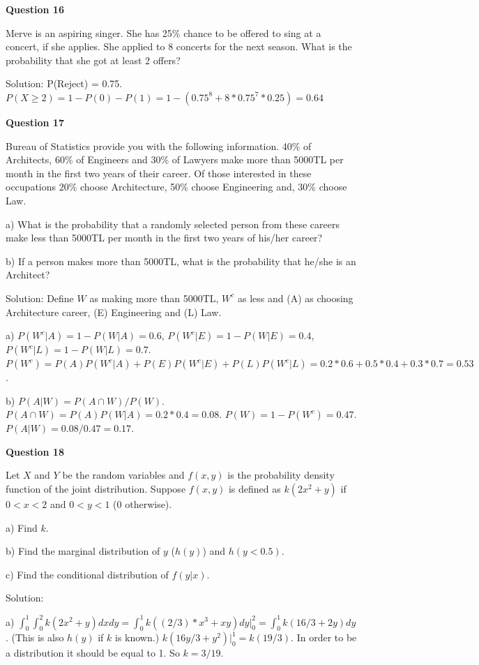 \documentclass[]{book}
\theoremstyle{definition}
\theoremstyle{definition}
\theoremstyle{definition}
\theoremstyle{remark}
\begin{document}
\textbf{Question 16}

Merve is an aspiring singer. She has 25\% chance to be offered to sing
at a concert, if she applies. She applied to 8 concerts for the next
season. What is the probability that she got at least 2 offers?

Solution: P(Reject) = 0.75.
\(P(X \ge 2) = 1 - P(0) - P(1) = 1 - (0.75^8 + 8*0.75^7*0.25) = 0.64\)

\textbf{Question 17}

Bureau of Statistics provide you with the following information. 40\% of
Architects, 60\% of Engineers and 30\% of Lawyers make more than 5000TL
per month in the first two years of their career. Of those interested in
these occupations 20\% choose Architecture, 50\% choose Engineering and,
30\% choose Law.

a) What is the probability that a randomly selected person from these
careers make less than 5000TL per month in the first two years of
his/her career?

b) If a person makes more than 5000TL, what is the probability that
he/she is an Architect?

Solution: Define \(W\) as making more than 5000TL, \(W^c\) as less and
(A) as choosing Architecture career, (E) Engineering and (L) Law.

a) \(P(W^c|A) = 1 - P(W|A) = 0.6\), \(P(W^c|E) = 1 - P(W|E) = 0.4\),
\(P(W^c|L) = 1 - P(W|L) = 0.7\).
\(P(W^c) = P(A)P(W^c|A)+P(E)P(W^c|E)+P(L)P(W^c|L) = 0.2*0.6+0.5*0.4+0.3*0.7 = 0.53\).

b) \(P(A|W) = P(A \cap W)/P(W)\).
\(P(A \cap W) = P(A)P(W|A) = 0.2*0.4 = 0.08\).
\(P(W) = 1 - P(W^c) = 0.47\). \(P(A|W) = 0.08/0.47 = 0.17\).

\textbf{Question 18}

Let \(X\) and \(Y\) be the random variables and \(f(x,y)\) is the
probability density function of the joint distribution. Suppose
\(f(x,y)\) is defined as \(k(2x^2 + y)\) if \(0<x<2\) and \(0<y<1\) (0
otherwise).

a) Find \(k\).

b) Find the marginal distribution of \(y\) (\(h(y)\)) and \(h(y<0.5)\).

c) Find the conditional distribution of \(f(y|x)\).

Solution:

a)
\(\int^1_0 \int^2_0 k(2x^2 + y) dx dy = \int^1_0 k((2/3)*x^3 + xy)dy|^2_0 = \int^1_0 k(16/3+2y) dy\).
(This is also \(h(y)\) if \(k\) is known.)
\(k(16y/3+y^2)|^1_0 = k(19/3)\). In order to be a distribution it should
be equal to 1. So \(k = 3/19\).
\end{document}
